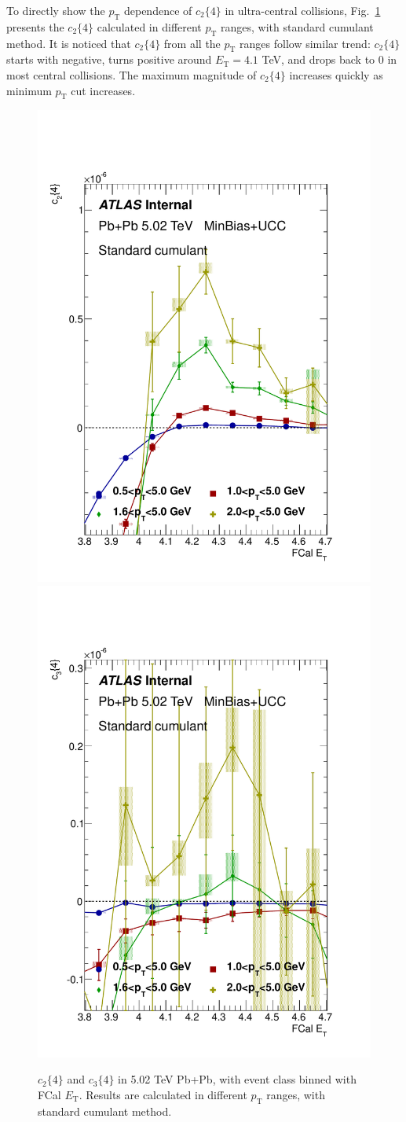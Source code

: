 To directly show the $p_\text{T}$ dependence of $c_2\{4\}$ in ultra-central collisions, Fig.~\ref{fig:PbPb502_UCC_FCal_v2_pT} presents the $c_2\{4\}$ calculated in different $p_\text{T}$ ranges, with standard cumulant method. It is noticed that $c_2\{4\}$ from all the $p_\text{T}$ ranges follow similar trend: $c_2\{4\}$ starts with negative, turns positive around $E_\text{T}=4.1$ TeV, and drops back to 0 in most central collisions. The maximum magnitude of $c_2\{4\}$ increases quickly as minimum $p_\text{T}$ cut increases.
\begin{figure}[H]
\centering
\includegraphics[width=.45\linewidth]{figs/sec_result/PbPb502_UCC/PbPb502_pT_1sub_Har2.pdf}
\includegraphics[width=.45\linewidth]{figs/sec_result/PbPb502_UCC/PbPb502_pT_1sub_Har3.pdf}
\caption{$c_2\{4\}$ and $c_3\{4\}$ in 5.02 TeV Pb+Pb, with event class binned with FCal $E_\text{T}$. Results are calculated in different $p_\text{T}$ ranges, with standard cumulant method.}
\label{fig:PbPb502_UCC_FCal_v2_pT}
\end{figure}

